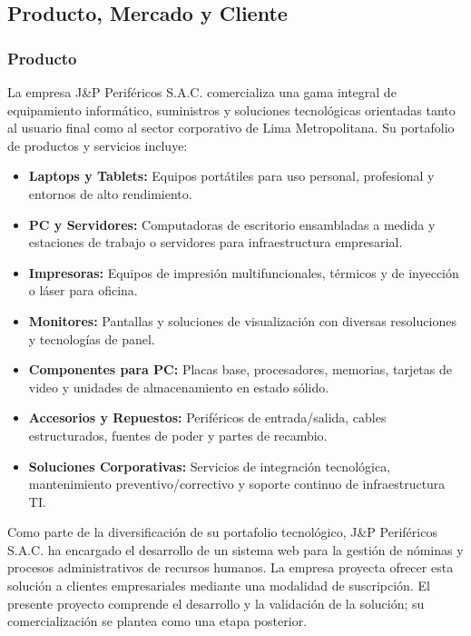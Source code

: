 \subsection{Producto, Mercado y Cliente}

\subsubsection{Producto}
La empresa J\&P Periféricos S.A.C. comercializa una gama integral de equipamiento informático, 
suministros y soluciones tecnológicas orientadas tanto al usuario final como al sector corporativo de Lima Metropolitana. Su portafolio de productos y servicios incluye:

\begin{itemize}
    \item \textbf{Laptops y Tablets:} Equipos portátiles para uso personal, profesional y entornos de alto rendimiento.
    \item \textbf{PC y Servidores:} Computadoras de escritorio ensambladas a medida y estaciones de trabajo o servidores para infraestructura empresarial.
    \item \textbf{Impresoras:} Equipos de impresión multifuncionales, térmicos y de inyección o láser para oficina.
    \item \textbf{Monitores:} Pantallas y soluciones de visualización con diversas resoluciones y tecnologías de panel.
    \item \textbf{Componentes para PC:} Placas base, procesadores, memorias, tarjetas de video y unidades de almacenamiento en estado sólido.
    \item \textbf{Accesorios y Repuestos:} Periféricos de entrada/salida, cables estructurados, fuentes de poder y partes de recambio.
    \item \textbf{Soluciones Corporativas:} Servicios de integración tecnológica, mantenimiento preventivo/correctivo y soporte continuo de infraestructura TI.
\end{itemize}

Como parte de la diversificación de su portafolio tecnológico, J\&P Periféricos S.A.C. ha encargado el desarrollo de un sistema web para la gestión de nóminas y procesos administrativos de recursos humanos. La empresa proyecta ofrecer esta solución a clientes empresariales mediante una modalidad de suscripción. El presente proyecto comprende el desarrollo y la validación de la solución; su comercialización se plantea como una etapa
posterior.

